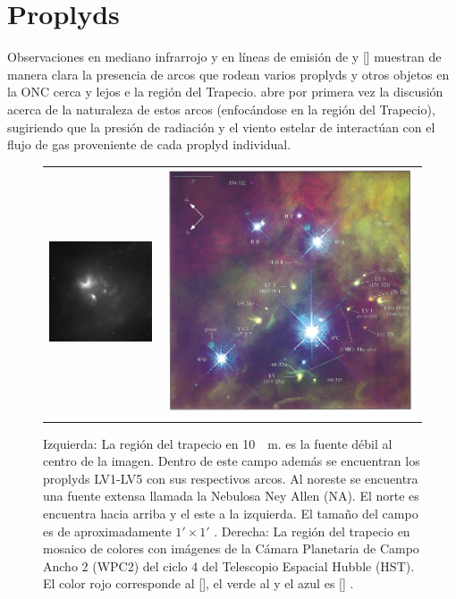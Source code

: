 \section{Proplyds}
Observaciones en mediano infrarrojo y en líneas de emisión de  y [] \citep{Robberto:2005, Bally:1998, Bally:2000} muestran de manera clara la presencia de arcos que rodean varios proplyds y otros objetos en la ONC cerca y lejos e la región del Trapecio. \citet{Hayward:1994} abre por primera vez la discusión acerca de la naturaleza de estos arcos (enfocándose en la región del Trapecio), sugiriendo que la presión de radiación y el viento estelar de \thC{} interactúan con el flujo de gas proveniente de cada proplyd individual.

\begin{figure}
  \begin{tabular}{lr}    \includegraphics[width=0.5\linewidth]{./Figures/Orion_Robberto}&\includegraphics[width=0.5\linewidth]{./Figures/bally-trapezium}
  \end{tabular}
  \caption{Izquierda: La región del trapecio en \SI{10}{\mu m}. \thC{} es la fuente débil al centro de la imagen. Dentro de este campo además se encuentran los proplyds LV1-LV5 con sus respectivos arcos. Al noreste se encuentra una fuente extensa llamada la Nebulosa Ney Allen (NA). El norte es encuentra hacia arriba y el este a la izquierda. El tamaño del campo es de aproximadamente $1' \times 1'$ \citep{Robberto:2005}. Derecha: La región del trapecio en mosaico de colores con imágenes de la Cámara Planetaria de Campo Ancho 2 (WPC2) del ciclo 4 del Telescopio Espacial Hubble (HST). El color rojo corresponde al [], el verde al  y el azul es [] \citep{Bally:1998}.}
\end{figure}

